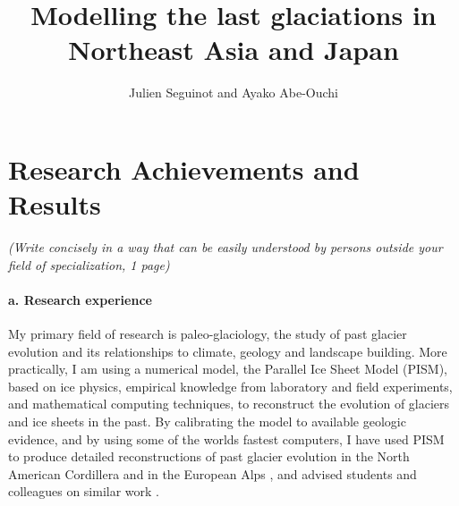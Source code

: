 \documentclass{article}
\title{Modelling the last glaciations in Northeast Asia and Japan}
\author{Julien Seguinot and Ayako Abe-Ouchi}
\begin{document}

\maketitle


\setcounter{section}{15}
\section{Research Achievements and Results}

    \emph{(Write concisely in a way that can be easily understood by persons
          outside your field of specialization, 1 page)}

\paragraph{a. Research experience}

    My primary field of research is paleo-glaciology, the study of past
    glacier evolution and its relationships to climate, geology and landscape
    building. More practically, I am using a numerical model, the Parallel Ice
    Sheet Model (PISM), based on ice physics, empirical knowledge from
    laboratory and field experiments, and mathematical computing techniques,
    to reconstruct the evolution of glaciers and ice sheets in the past. By
    calibrating the model to available geologic evidence, and by using some
    of the worlds fastest computers, I have used PISM to produce detailed
    reconstructions of past glacier evolution in the North American Cordillera
    \citep{Seguinot.etal.2014, Seguinot.etal.2016} and in the European Alps
    \citep{Seguinot.etal.2018}, and advised students and colleagues on similar
    work \citep{Becker.etal.2016, Jouvet.etal.2017a, Imhof.etal.2019}.
\end{document}
